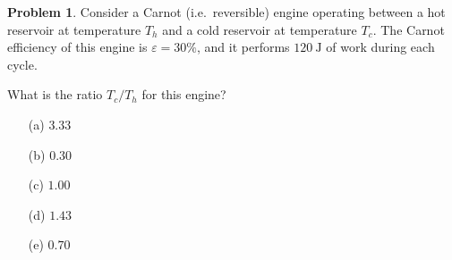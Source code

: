 \documentclass[10pt]{article}
\theoremstyle{definition} %
\newtheorem{problem}{Problem}
\theoremstyle{plain} %
\begin{document}
                                  \begin{problem}
                                    Consider a Carnot (i.e.\ reversible) engine operating between a hot
                                    reservoir at temperature \(T_{h}\) and a cold reservoir at
                                    temperature \(T_{c}\).
                                    The Carnot efficiency of this engine is \(\varepsilon = 30\%\), and it
                                    performs \(120\ \text{J}\) of work during each cycle.
                                    
                                    \medskip
                                    What is the ratio \(T_{c}/T_{h}\) for this engine?
                                    
                                    \begin{enumerate}
                                      \item[(a)] \(3.33\)
                                      \item[(b)] \(0.30\)
                                      \item[(c)] \(1.00\)
                                      \item[(d)] \(1.43\)
                                      \item[(e)] \(0.70\)
                                    \end{enumerate}
                                    \end{problem}
\end{document}
